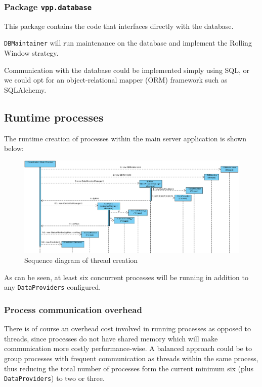 \subsubsection{Package \texttt{vpp.database}}
This package contains the code that interfaces directly with the database. 

\texttt{DBMaintainer} will run maintenance on the database and implement the Rolling Window strategy.

Communication with the database could be implemented simply using SQL, or we could opt for an object-relational mapper (ORM) framework such as SQLAlchemy.


\subsection{Runtime processes}

The runtime creation of processes within the main server application is shown below:
\begin{figure}[H]
    \centering
    \includegraphics[width=\textwidth]{figures/seq_diagram}
    \caption{Sequence diagram of thread creation}
    \label{figureSeqDiagram}
\end{figure}
As can be seen, at least six concurrent processes will be running in addition to any \texttt{DataProviders} configured.


\subsubsection{Process communication overhead}
There is of course an overhead cost involved in running processes as opposed to threads, since processes do not have shared memory which will make communication more costly performance-wise. A balanced approach could be to group processes with frequent communication as threads within the same process, thus reducing the total number of processes form the current minimum six (plus \texttt{DataProviders}) to two or three. 

